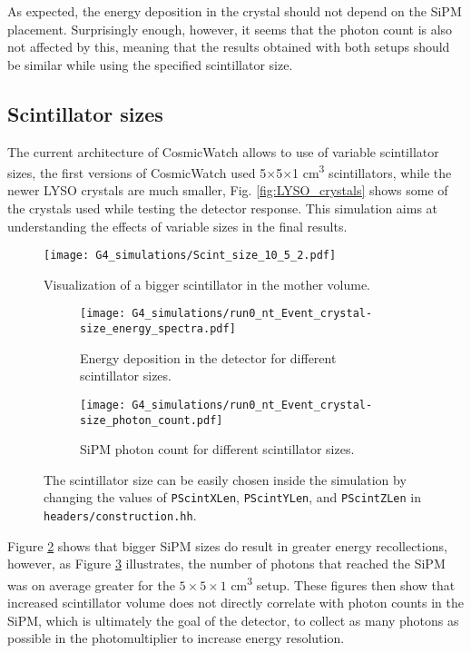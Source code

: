 As expected, the energy deposition in the crystal should not depend on the SiPM placement. Surprisingly enough, however, it seems that the photon count is also not affected by this, meaning that the results obtained with both setups should be similar while using the specified scintillator size.

\subsection{Scintillator sizes}\label{sec:Scint_size}

The current architecture of CosmicWatch allows to use of variable scintillator sizes, the first versions of CosmicWatch used 5$\times$5$\times$1 \unit{\cm\cubed} scintillators, while the newer LYSO crystals are much smaller, Fig. \ref{fig:LYSO_crystals} shows some of the crystals used while testing the detector response. This simulation aims at understanding the effects of variable sizes in the final results.

\begin{figure}
  \centering
    \texttt{[image: G4\_simulations/Scint\_size\_10\_5\_2.pdf]}
  \caption{\label{fig:Scint_10_5_2}Visualization of a bigger scintillator in the mother volume.}
\end{figure}

\begin{figure}
  \centering
  \begin{subfigure}[t]{0.48\textwidth}
    \texttt{[image: G4\_simulations/run0\_nt\_Event\_crystal-size\_energy\_spectra.pdf]}
    \caption{\label{sfig:scint_size_edep}Energy deposition in the detector for different scintillator sizes.}
  \end{subfigure}
  \hfill
  \begin{subfigure}[t]{0.48\textwidth}
    \texttt{[image: G4\_simulations/run0\_nt\_Event\_crystal-size\_photon\_count.pdf]}
    \caption{\label{sfig:scint_size_pcount}SiPM photon count for different scintillator sizes.}
  \end{subfigure}
  \caption{\label{fig:scint_size_results}The scintillator size can be easily chosen inside the simulation by changing the values of \texttt{PScintXLen}, \texttt{PScintYLen}, and \texttt{PScintZLen} in \texttt{headers/construction.hh}.}
\end{figure}

Figure \ref{sfig:scint_size_edep} shows that bigger SiPM sizes do result in greater energy recollections, however, as Figure \ref{sfig:scint_size_pcount} illustrates, the number of photons that reached the SiPM was on average greater for the $5\times5\times1$ \unit{\cm\cubed} setup. These figures then show that increased scintillator volume does not directly correlate with photon counts in the SiPM, which is ultimately the goal of the detector, to collect as many photons as possible in the photomultiplier to increase energy resolution.

